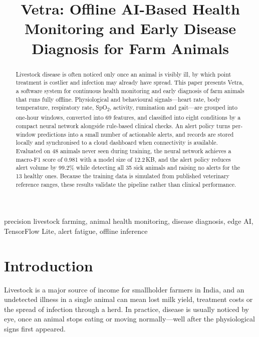 \documentclass[conference]{IEEEtran}
\begin{document}
\title{Vetra: Offline AI-Based Health Monitoring and Early Disease Diagnosis for Farm Animals}

\author{
}

\maketitle

\begin{abstract}
Livestock disease is often noticed only once an animal is visibly ill, by which
point treatment is costlier and infection may already have spread. This paper
presents Vetra, a software system for continuous health monitoring and early
diagnosis of farm animals that runs fully offline. Physiological and behavioural
signals---heart rate, body temperature, respiratory rate, SpO\textsubscript{2},
activity, rumination and gait---are grouped into one-hour windows, converted into
69 features, and classified into eight conditions by a compact neural network
alongside rule-based clinical checks. An alert policy turns per-window
predictions into a small number of actionable alerts, and records are stored
locally and synchronised to a cloud dashboard when connectivity is available.
Evaluated on 48 animals never seen during training, the neural network achieves
a macro-F1 score of 0.981 with a model size of 12.2\,KB, and the alert policy
reduces alert volume by 99.2\% while detecting all 35 sick animals and raising
no alerts for the 13 healthy ones. Because the training data is simulated from
published veterinary reference ranges, these results validate the pipeline
rather than clinical performance.
\end{abstract}

\begin{IEEEkeywords}
precision livestock farming, animal health monitoring, disease diagnosis,
edge AI, TensorFlow Lite, alert fatigue, offline inference
\end{IEEEkeywords}

\section{Introduction}
Livestock is a major source of income for smallholder farmers in India, and an
undetected illness in a single animal can mean lost milk yield, treatment costs
or the spread of infection through a herd. In practice, disease is usually
noticed by eye, once an animal stops eating or moving normally---well after the
physiological signs first appeared.
\end{document}

